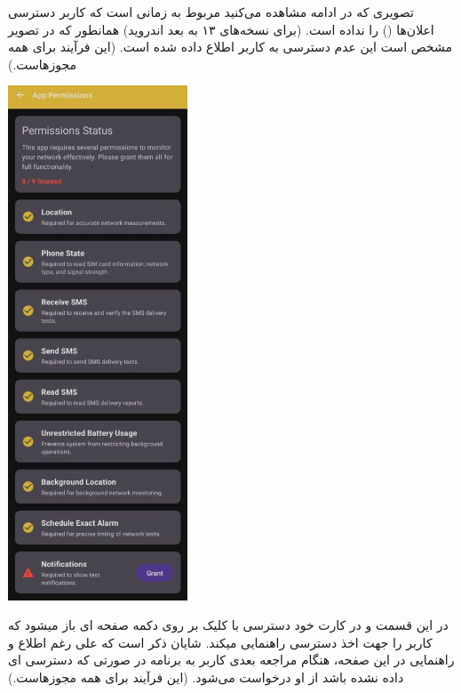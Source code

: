 \begin{itemize}
\begin{itemize}
        تصویری که در ادامه مشاهده می‌کنید مربوط به زمانی است که کاربر دسترسی اعلان‌ها () را نداده است. (برای نسخه‌های ۱۳ به بعد اندروید) همانطور که در تصویر مشخص است این عدم دسترسی به کاربر اطلاع داده شده است. (این فرآیند برای همه مجوزهاست.)
            \begin{center}
		\includegraphics[width=0.4\textwidth]{images/Permission.jpeg}
	    \end{center}
        در این قسمت و در کارت خود دسترسی  با کلیک بر روی دکمه  صفحه ای باز میشود که کاربر را جهت اخذ دسترسی راهنمایی میکند. شایان ذکر است که علی رغم اطلاع و راهنمایی در این صفحه، هنگام مراجعه بعدی کاربر به برنامه در صورتی که دسترسی ای داده نشده باشد از او درخواست می‌شود. (این فرآیند برای همه مجوزهاست.)
            \begin{center}

\end{center}
\end{itemize}
\end{itemize}
